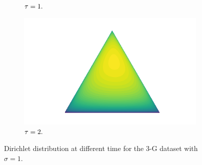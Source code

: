 \begin{figure}[H]
\begin{subfigure}{0.25\textwidth}
        \caption{$\tau = 1.$}
    \end{subfigure}
    \hspace{-0.4cm}
    \begin{subfigure}{0.25\textwidth}
        \centering
        \includegraphics[width=\linewidth]{sections/010_neurips2019/paper/images/60.png}
		\caption{$\tau = 2.$}
    \end{subfigure}
    \caption{Dirichlet distribution at different time  for the 3-G dataset with $\sigma =1.$}
    \label{fig:dirichlet_triangle_evolution}
\end{figure}